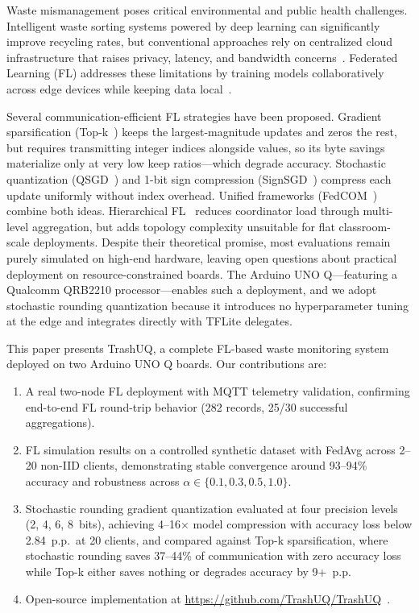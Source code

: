 
Waste mismanagement poses critical environmental and public health
challenges. Intelligent waste sorting systems powered by deep learning can
significantly improve recycling rates, but conventional approaches rely on
centralized cloud infrastructure that raises privacy, latency, and bandwidth
concerns~\cite{mcmahan2017fedavg}. Federated Learning (FL) addresses these
limitations by training models collaboratively across edge devices while
keeping data local~\cite{li2020fedavg,kairouz2021fl}.

Several communication-efficient FL strategies have been proposed. Gradient
sparsification (Top-k~\cite{aji2017topk}) keeps the largest-magnitude updates
and zeros the rest, but requires transmitting integer indices alongside values,
so its byte savings materialize only at very low keep ratios---which degrade
accuracy. Stochastic quantization (QSGD~\cite{alistarh2017qsgd}) and 1-bit
sign compression (SignSGD~\cite{bernstein2018signsgd}) compress each update
uniformly without index overhead. Unified frameworks
(FedCOM~\cite{haddadpour2021fedcom}) combine both ideas. Hierarchical
FL~\cite{liu2020hierarchical,abad2020hierarchical} reduces coordinator load
through multi-level aggregation, but adds topology complexity unsuitable for
flat classroom-scale deployments. Despite their theoretical promise, most
evaluations remain purely simulated on high-end hardware, leaving open
questions about practical deployment on resource-constrained boards. The
Arduino UNO Q---featuring a Qualcomm QRB2210 processor---enables such a
deployment, and we adopt stochastic rounding quantization because it
introduces no hyperparameter tuning at the edge and integrates directly with
TFLite delegates.

This paper presents TrashUQ, a complete FL-based waste monitoring system
deployed on two Arduino UNO Q boards. Our contributions are:
\begin{enumerate}
  \item A real two-node FL deployment with MQTT telemetry validation,
  confirming end-to-end FL round-trip behavior (282 records, 25/30 successful
  aggregations).
  \item FL simulation results on a controlled synthetic dataset with FedAvg
  across 2--20 non-IID clients, demonstrating stable convergence around
  93--94\% accuracy and robustness across
  $\alpha \in \{0.1, 0.3, 0.5, 1.0\}$.
  \item Stochastic rounding gradient quantization evaluated at four precision
  levels (2, 4, 6, 8~bits), achieving 4--16$\times$ model compression with
  accuracy loss below 2.84~p.p.\ at 20 clients, and compared against Top-k
  sparsification, where stochastic rounding saves 37--44\% of communication
  with zero accuracy loss while Top-k either saves nothing or degrades
  accuracy by 9+~p.p.
  \item Open-source implementation at
  \url{https://github.com/TrashUQ/TrashUQ}~\cite{trashuqrepo}.
\end{enumerate}
